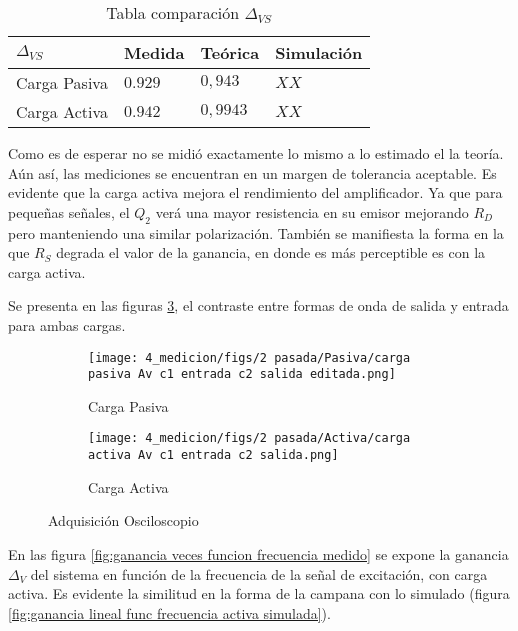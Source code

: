 \begin{table}[ht]
    \centering
    \begin{tabular}{|l|l|l|l|}
    \hline
    $\Delta_{VS} $  & Medida   & Teórica  & Simulación \\ \hline
    Carga Pasiva & $0.929$  & $0,943$ &  $XX$       \\ \hline
    Carga Activa & $0.942$  & $0,9943$ &  $XX$          \\ \hline
    \end{tabular}
    \caption{Tabla comparación $\Delta_{VS}$}\label{table:comp avs}
\end{table}

Como es de esperar no se midió exactamente lo mismo a lo estimado el la teoría. Aún así, las mediciones se encuentran en un margen de tolerancia aceptable. 
Es evidente que la carga activa mejora el rendimiento del amplificador. Ya que para pequeñas señales, el $Q_2$ verá una mayor resistencia en su emisor mejorando $R_D$ pero manteniendo una similar polarización. 
También se manifiesta la forma en la que $R_S$ degrada el valor de la ganancia, en donde es más perceptible es con la carga activa. 

Se presenta en las figuras \ref{fig:Av oscilo}, el contraste entre formas de onda de salida y entrada para ambas cargas.


\begin{figure}[ht]
\begin{subfigure}{.45\textwidth}
  \centering
  \texttt{[image: 4\_medicion/figs/2 pasada/Pasiva/carga pasiva Av c1 entrada c2 salida editada.png]}  
  \caption{Carga Pasiva}
  \label{fig:Av carga pasiva}
\end{subfigure}
\begin{subfigure}{.45\textwidth}
  \centering
  \texttt{[image: 4\_medicion/figs/2 pasada/Activa/carga activa Av c1 entrada c2 salida.png]}  
  \caption{Carga Activa}
  \label{fig:Av carga activa}
\end{subfigure}
\caption{Adquisición Osciloscopio}
\label{fig:Av oscilo}
\end{figure}

En las figura \ref{fig:ganancia veces funcion frecuencia medido} se expone la ganancia $\Delta_V$ del sistema en función de la frecuencia de la señal de excitación, con carga activa.
Es evidente la similitud en la forma de la campana con lo simulado (figura \ref{fig:ganancia lineal func frecuencia activa simulada}).

